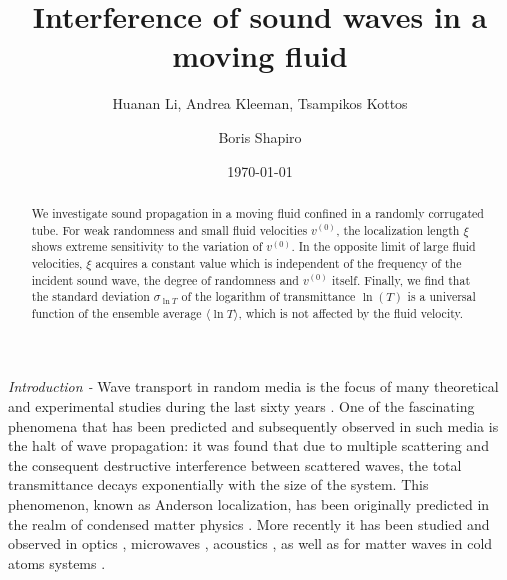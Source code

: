 \documentclass[aps,prl,twocolumn,groupedaddress,amsmath,amssymb]{revtex4}
\begin{document}
\title{Interference of sound waves in a moving fluid}

\author{Huanan Li, Andrea Kleeman, Tsampikos Kottos}
\author{Boris Shapiro}


\date{\today}

\begin{abstract}
We investigate sound propagation in a moving fluid confined in a randomly corrugated tube. For weak randomness and small fluid
velocities $v^{(0)}$, the localization length $\xi$ shows extreme sensitivity to the variation of $v^{(0)}$. In the opposite limit of large 
fluid velocities, $\xi$ acquires a constant value which is independent of the frequency of the incident sound wave, the degree of 
randomness and $v^{(0)}$ itself. Finally, we find that the standard deviation $\sigma_{\ln T}$ of the logarithm of transmittance $\ln(T)$ 
is a universal function of the ensemble average $\langle \ln T\rangle $, which is not affected by the fluid velocity.
\end{abstract}



\maketitle
{\it Introduction -}
Wave transport in random media is the focus of many theoretical and experimental studies during the last sixty years \cite{50years}. One 
of the fascinating phenomena that has been predicted and subsequently observed in such media is the halt of wave propagation:
it was found that due to multiple scattering and the consequent destructive interference between scattered waves, the total transmittance 
decays exponentially with the size of the system. This phenomenon, known as Anderson localization, has been originally predicted 
in  the realm of condensed matter physics \cite{A58,LR69}. More recently it has been studied and observed in optics \cite{WBLR97,
LAPSMCS08,PPKSBNTL04,SBFS07}, microwaves \cite{CSG00,BZKKS09}, acoustics \cite{acoustic}, as well as for matter waves in cold atoms
systems \cite{SL10,S12}.
\end{document}

